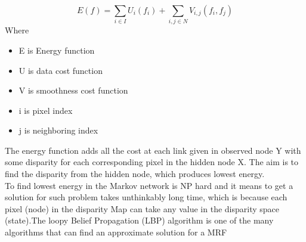 \documentclass{singlecol-new}
\theoremstyle{TH}{
\newtheorem{lemma}{Lemma}
\newtheorem{theorem}[lemma]{Theorem}
\newtheorem{corrolary}[lemma]{Corrolary}
\newtheorem{conjecture}[lemma]{Conjecture}
\newtheorem{proposition}[lemma]{Proposition}
\newtheorem{claim}[lemma]{Claim}
\newtheorem{stheorem}[lemma]{Wrong Theorem}
\newtheorem{algorithm}{Algorithm}
}
\theoremstyle{THrm}{
\newtheorem{definition}{Definition}[section]
\newtheorem{question}{Question}[section]
\newtheorem{remark}{Remark}
\newtheorem{scheme}{Scheme}
}
\theoremstyle{THhit}{
\newtheorem{case}{Case}[section]
}
\begin{document}
\begin{equation}\label{}
    E (f)  =\sum_{i\in I}U_{i}(f_{i}) + \sum_{i,j\in N}V_{i,j}(f_{i},f_{j})
\end{equation}
Where
\begin{itemize}
 \item{E is Energy function}
  \item  {U is data cost function}








  \item {V is smoothness cost function }
  \item{i is pixel index }
  \item{j is neighboring index}
























\end{itemize}
The energy function adds all the cost at each link given in observed node Y with some disparity for each corresponding pixel in the hidden node X. The aim is to find the disparity from the hidden node, which produces lowest energy. \\To find lowest energy in the Markov network is NP hard and it means to get a solution for such problem takes unthinkably long time, which is because each pixel (node) in the disparity Map can take any value in the disparity space (state).The loopy Belief Propagation (LBP) algorithm is one of the many algorithms that can find an approximate solution for a MRF
\end{document}
